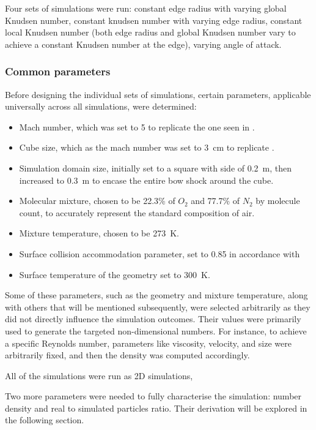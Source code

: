 Four sets of simulations were run: constant edge radius with varying global Knudsen number, constant knudsen number with varying edge radius, constant local Knudsen number (both edge radius and global Knudsen number vary to achieve a constant Knudsen number at the edge), varying angle of attack.

\subsubsection{Common parameters}
Before designing the individual sets of simulations, certain parameters, applicable universally across all simulations, were determined:
\begin{itemize}
    \item Mach number, which was set to 5 to replicate the one seen in \cite{rees}.
    \item Cube size, which as the mach number was set to \qty{3}{\cm} to replicate \cite{rees}.
    \item Simulation domain size, initially set to a square with side of \qty{0.2}{\m}, then increased to \qty{0.3}{\m} to encase the entire bow shock around the cube.
    \item Molecular mixture, chosen to be 22.3\% of $O_{2}$ and 77.7\% of $N_{2}$ by molecule count, to accurately represent the standard composition of air.
    \item Mixture temperature, chosen to be \qty{273}{\kelvin}.
    \item Surface collision accommodation parameter, set to 0.85 in accordance with \cite{accomod}
    \item Surface temperature of the geometry set to \qty{300}{\kelvin}.
\end{itemize}

Some of these parameters, such as the geometry and mixture temperature, along with others that will be mentioned subsequently, were selected arbitrarily as they did not directly influence the simulation outcomes. Their values were primarily used to generate the targeted non-dimensional numbers. For instance, to achieve a specific Reynolds number, parameters like viscosity, velocity, and size were arbitrarily fixed, and then the density was computed accordingly.

All of the simulations were run as 2D simulations, 

Two more parameters were needed to fully characterise the simulation: number density and real to simulated particles ratio. Their derivation will be explored in the following section.

